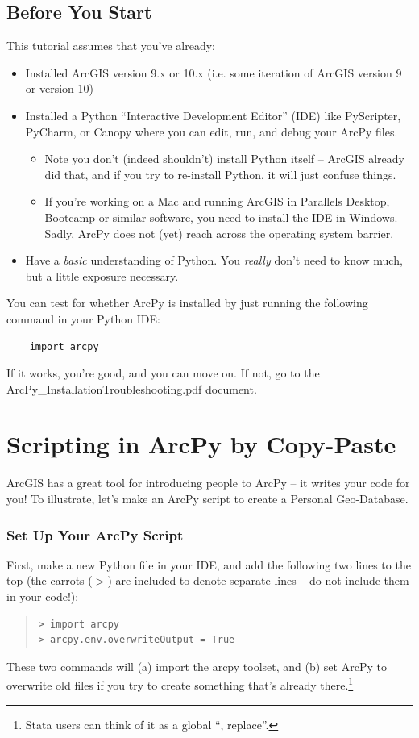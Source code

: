 \documentclass[12pt]{article}
\begin{document}
\subsection*{Before You Start}
This tutorial assumes that you've already:
\begin{itemize}
	\item Installed ArcGIS version 9.x or 10.x (i.e. some iteration of ArcGIS version 9 or version 10)
	\item Installed a Python ``Interactive Development Editor'' (IDE) like PyScripter, PyCharm, or Canopy where you can edit, run, and debug your ArcPy files. 
	\begin{itemize}
		\item Note you don't (indeed shouldn't) install Python itself -- ArcGIS already did that, and if you try to re-install Python, it will just confuse things. 
		\item If you're working on a Mac and running ArcGIS in Parallels Desktop, Bootcamp or similar software, you need to install the IDE in Windows. Sadly, ArcPy does not (yet) reach across the operating system barrier. 
	\end{itemize} 
	\item Have a \emph{basic} understanding of Python. You \emph{really} don't need to know much, but a little exposure necessary. 
\end{itemize}

You can test for whether ArcPy is installed by just running the following command in your Python IDE: 
\begin{verbatim}
	import arcpy
\end{verbatim}

If it works, you're good, and you can move on. If not, go to the ArcPy\_InstallationTroubleshooting.pdf document. 

\pagebreak
\section{Scripting in ArcPy by Copy-Paste}\label{scripting}

ArcGIS has a great tool for introducing people to ArcPy -- it writes your code for you! To illustrate, let's make an ArcPy script to create a Personal Geo-Database. 

\subsubsection*{Set Up Your ArcPy Script} 
First, make a new Python file in your IDE, and add the following two lines to the top (the carrots ($>$) are included to denote separate lines -- do not include them in your code!):
\begin{quote}
\begin{verbatim}
> import arcpy
> arcpy.env.overwriteOutput = True
\end{verbatim}	
\end{quote}
These two commands will (a) import the arcpy toolset, and (b) set ArcPy to overwrite old files if you try to create something that's already there.\footnote{Stata users can think of it as a global ``, replace''.} 
\end{document}
